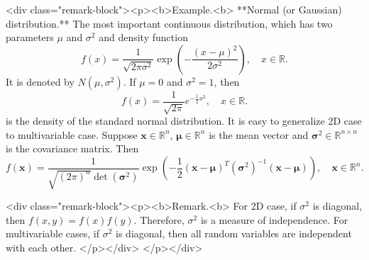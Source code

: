 <div class="remark-block"><p><b>Example.<b> 
**Normal (or Gaussian) distribution.** The most important continuous distribution, which has two parameters $\mu$ and $\sigma^2$ and density function
$$\begin{equation}
    f(x) = \frac{1}{\sqrt{2\pi\sigma^2}} \exp \left( -\frac{(x-\mu)^2}{2\sigma^2} \right), \quad x\in\mathbb{R}. 
\end{equation}$$
It is denoted by $N(\mu, \sigma^2)$. If $\mu=0$ and $\sigma^2=1$, then
$$\begin{equation}
    f(x) = \frac{1}{\sqrt{2\pi}} e^{-\frac{1}{2}x^2}, \quad x\in\mathbb{R}.
\end{equation}$$
is the density of the standard normal distribution. It is easy to generalize 2D case to multivariable case. Suppose $\mathbf{x} \in \mathbb{R}^n$, $\mathbf{\mu} \in \mathbb{R}^n$ is the mean vector and $\mathbf{\sigma}^2 \in \mathbb{R}^{n\times n}$ is the covariance matrix. Then
$$\begin{equation}
    f(\mathbf{x}) = \frac{1}{\sqrt{(2\pi)^n} \det(\mathbf{\sigma}^2)} \exp \left( -\frac{1}{2} (\mathbf{x}-\mathbf{\mu})^T (\mathbf{\sigma}^2)^{-1} (\mathbf{x}-\mathbf{\mu}) \right), \quad \mathbf{x} \in \mathbb{R}^n.
\end{equation}$$

<div class="remark-block"><p><b>Remark.<b> 
For 2D case, if $\sigma^2$ is diagonal, then $f(x,y) = f(x)f(y)$. Therefore, $\sigma^2$ is a measure of independence. For multivariable cases, if $\sigma^2$ is diagonal, then all random variables are independent with each other.
</p></div>
</p></div>


